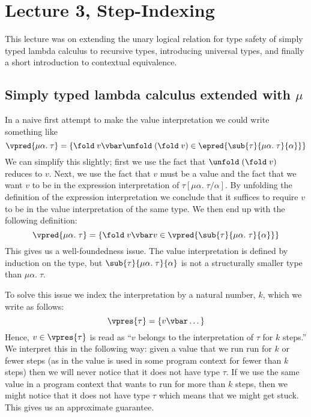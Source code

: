 \section*{Lecture 3, Step-Indexing}
This lecture was on extending the unary logical relation for type safety of simply typed lambda calculus to recursive types, introducing universal types, and finally a short introduction to contextual equivalence.

\subsection*{Simply typed lambda calculus extended with $\mu$}
In a naive first attempt to make the value interpretation we could write something like
\[
  \vpred{\mu\alpha. \; \tau} = \{\fold \; v \vbar \unfold \; (\fold \; v) \in \epred{\sub{\tau}{\mu\alpha.\;\tau}{\alpha}} \}
\]
We can simplify this slightly; first we use the fact that $\unfold \; (\fold \; v)$ reduces to $v$. Next, we use the fact that $v$ must be a value and the fact that we want $v$ to be in the expression interpretation of $\tau[\mu \alpha. \; \tau / \alpha]$. By unfolding the definition of the expression interpretation we conclude that it suffices to require $v$ to be in the value interpretation of the same type. We then end up with the following definition:
\[
  \vpred{\mu\alpha. \; \tau} = \{\fold \; v \vbar v \in \vpred{\sub{\tau}{\mu\alpha.\;\tau}{\alpha}} \}
\]
This gives us a well-foundedness issue. The value interpretation is defined by induction on the type, but $\sub{\tau}{\mu\alpha.\;\tau}{\alpha}$ is not a structurally smaller type than $\mu\alpha. \; \tau$.

To solve this issue we index the interpretation by a natural number, $k$, which we write as follows:
\[
  \vpres{\tau} = \{v \vbar \dots \}
\]
Hence, $v \in \vpres{\tau}$ is read as ``$v$ belongs to the
interpretation of $\tau$ for $k$ steps.'' We interpret this in the
following way: given a value that we run run for $k$ or fewer steps (as
in the value is used in some program context for fewer than $k$ steps) then
we will never notice that it does not have type $\tau$. If we use the
same value in a program context that wants to run for more than $k$
steps, then we might notice that it does not have type $\tau$ which
means that we might get stuck. This gives us an approximate guarantee.

